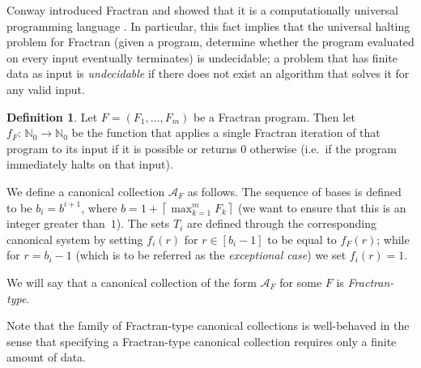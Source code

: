 \documentclass[12pt]{article}
\theoremstyle{definition}
\newtheorem{definition}{Definition}
\newcommand{\N}{\mathbb{N}}
\begin{document}
Conway introduced Fractran and showed that it is a computationally universal programming language \cite{book:Fractran}. In particular, this fact implies that the universal halting problem for Fractran (given a program, determine whether the program evaluated on every input eventually terminates) is undecidable; a problem that has finite data as input is \emph{undecidable} if there does not exist an algorithm that solves it for any valid input.

\begin{definition}
\label{def:Fractran-type}
Let $F=(F_1,\dotsc,F_m)$ be a Fractran program. Then let $f_F\colon\,\N_0\to\N_0$ be the function that applies a single Fractran iteration of that program to its input if it is possible or returns 0 otherwise (i.e.\ if the program immediately halts on that input).

We define a canonical collection $\mathcal{A}_F$ as follows. The sequence of bases is defined to be $b_i = b^{i+1}$, where $b = 1 + \left\lceil\max_{k=1}^mF_k\right\rceil$ (we want to ensure that this is an integer greater than~$1$). The sets $T_i$ are defined through the corresponding canonical system by setting $f_i(r)$ for $r\in[b_i-1]$ to be equal to $f_F(r)$; while for $r=b_i-1$ (which is to be referred as the \emph{exceptional case}) we set $f_i(r)=1$.

We will say that a canonical collection of the form $\mathcal{A}_F$ for some $F$ is \emph{Fractran-type}.
\end{definition}
Note that the family of Fractran-type canonical collections is well-behaved in the sense that specifying a Fractran-type canonical collection requires only a finite amount of data.
\end{document}
